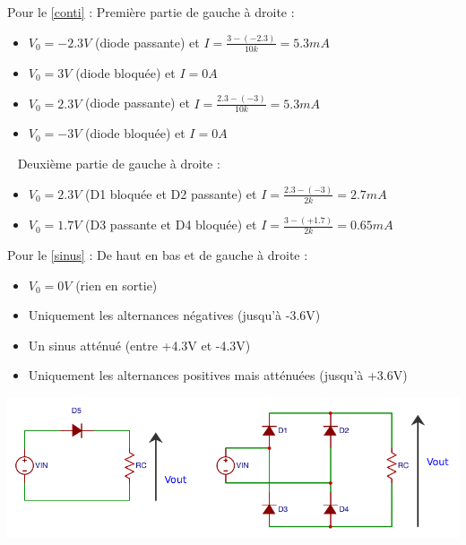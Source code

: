 \documentclass{../template/tp}
\begin{document}
{%
Pour le \ref{conti} :
Première partie de gauche à droite :
\begin{itemize}
    \item $V_0 = -2.3V$ (diode passante) et $I = \frac{3-(-2.3)}{10k}=5.3mA$
    \item $V_0 = 3V$ (diode bloquée) et $I=0A$
    \item $V_0 = 2.3V$ (diode passante) et $I= \frac{2.3-(-3)}{10k}=5.3mA$
    \item $V_0 = -3V$ (diode bloquée) et $I = 0A$
\end{itemize}
~\newline
Deuxième partie de gauche à droite :
\begin{itemize}
    \item $V_0 = 2.3V$ (D1 bloquée et D2 passante) et $I = \frac{2.3-(-3)}{2k} = 2.7mA$
    \item $V_0 = 1.7V$ (D3 passante et D4 bloquée) et $I = \frac{3-(+1.7)}{2k} = 0.65mA$
\end{itemize}

Pour le \ref{sinus} :
De haut en bas et de gauche à droite :
    \begin{itemize}
        \item $V_0 = 0V$ (rien en sortie)
        \item Uniquement les alternances négatives (jusqu'à -3.6V)
        \item Un sinus atténué (entre +4.3V et -4.3V)
        \item Uniquement les alternances positives mais atténuées (jusqu'à +3.6V)
    \end{itemize}

}

{%
\begin{center}
    \includegraphics[width=\linewidth]{redr}
\end{center}
}
\end{document}

